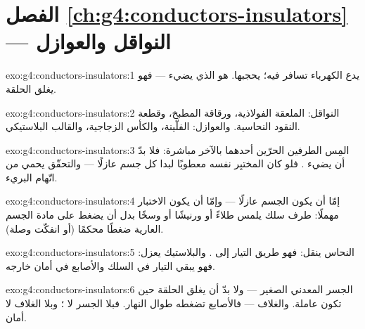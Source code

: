 \section*{الفصل \ref{ch:g4:conductors-insulators} --- النواقل والعوازل}

\begin{solution}{exo:g4:conductors-insulators:1}
 يدع الكهرباء تسافر فيه؛  يحجبها.  هو الذي
يضيء  --- فهو يغلق الحلقة.
\end{solution}

\begin{solution}{exo:g4:conductors-insulators:2}
النواقل: الملعقة الفولاذية، ورقاقة المطبخ، وقطعة النقود
النحاسية. والعوازل: الفلّينة، والكأس الزجاجية، والقالب
البلاستيكي.
\end{solution}

\begin{solution}{exo:g4:conductors-insulators:3}
المِس الطرفين الحرّين أحدهما بالآخر مباشرة: فلا بدّ أن يضيء
. فلو كان المختبِر نفسه معطوبًا لبدا كل جسم عازلًا ---
والتحقّق يحمي من اتّهام البريء.
\end{solution}

\begin{solution}{exo:g4:conductors-insulators:4}
إمّا أن يكون الجسم عازلًا --- وإمّا أن يكون الاختبار مهملًا:
طرف سلك يلمس طلاءً أو ورنيشًا أو وسخًا بدل أن يضغط على مادة
الجسم العارية ضغطًا محكمًا (أو انفكّت وصلة).
\end{solution}

\begin{solution}{exo:g4:conductors-insulators:5}
النحاس ينقل: فهو طريق التيار إلى . والبلاستيك يعزل: فهو
يبقي التيار في السلك والأصابع في أمان خارجه.
\end{solution}

\begin{solution}{exo:g4:conductors-insulators:6}
الجسر المعدني الصغير  --- ولا بدّ أن يغلق الحلقة حين تكون
 عاملة. والغلاف  --- فالأصابع تضغطه طوال النهار.
فبلا الجسر لا ؛ وبلا الغلاف لا أمان.
\end{solution}

